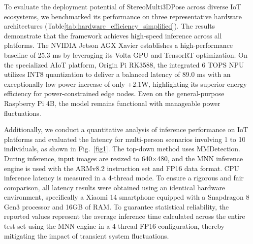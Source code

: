 \documentclass[journal]{IEEEtran}
\begin{document}
\begin{table}[h]
    \centering
    \small
    \caption{Cross-platform hardware performance and energy stability. The latency is measured for a single subject to represent the baseline inference speed. The average power increase represents the delta between active inference and idle state.}
    \label{tab:hardware_efficiency_simplified}
    \renewcommand{\arraystretch}{1.5}
\end{table}


To evaluate the deployment potential of StereoMulti3DPose across diverse IoT ecosystems, we benchmarked its performance on three representative hardware architectures (Table\ref{tab:hardware_efficiency_simplified}). The results demonstrate that the framework achieves high-speed inference across all platforms. The NVIDIA Jetson AGX Xavier establishes a high-performance baseline of 25.3 ms by leveraging its Volta GPU and TensorRT optimization. On the specialized AIoT platform, Origin Pi RK3588, the integrated 6 TOPS NPU utilizes INT8 quantization to deliver a balanced latency of 89.0 ms with an exceptionally low power increase of only +2.1W, highlighting its superior energy efficiency for power-constrained edge nodes. Even on the general-purpose Raspberry Pi 4B, the model remains functional with manageable power fluctuations.


Additionally, we conduct a quantitative analysis of inference performance on IoT platforms and evaluated the latency for multi-person scenarios involving 1 to 10 individuals, as shown in Fig.~\ref{fig1}. The top-down method uses MMDetection. During inference, input images are resized to 640×480, and the MNN inference engine is used with the ARMv8.2 instruction set and FP16 data format. CPU inference latency is measured in a 4-thread mode. To ensure a rigorous and fair comparison, all latency results were obtained using an identical hardware environment, specifically a Xiaomi 14 smartphone equipped with a Snapdragon 8 Gen3 processor and 16GB of RAM. To guarantee statistical reliability, the reported values represent the average inference time calculated across the entire test set using the MNN engine in a 4-thread FP16 configuration, thereby mitigating the impact of transient system fluctuations.
\end{document}
